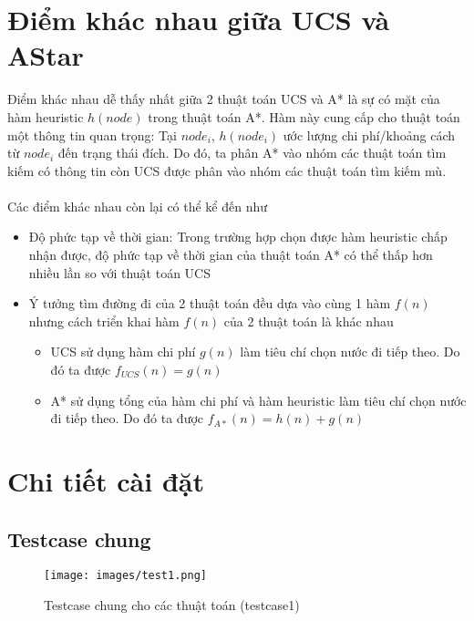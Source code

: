 \documentclass[a4paper, 12pt]{article}
\begin{document}
    \section{Điểm khác nhau giữa UCS và AStar} 
    Điểm khác nhau dễ thấy nhất giữa 2 thuật toán UCS và A* là sự có mặt của hàm heuristic $h(node)$ trong thuật toán A*. Hàm này cung cấp cho thuật toán một thông tin quan trọng: Tại $node_i$, $h(node_i)$ ước lượng chi phí/khoảng cách từ $node_i$ đến trạng thái đích. Do đó, ta phân A* vào nhóm các thuật toán tìm kiếm có thông tin còn UCS được phân vào nhóm các thuật toán tìm kiếm mù.\\\\
    Các điểm khác nhau còn lại có thể kể đến như
    \begin{itemize}
        \item Độ phức tạp về thời gian: Trong trường hợp chọn được hàm heuristic chấp nhận được, độ phức tạp về thời gian của thuật toán A* có thể thấp hơn nhiều lần so với thuật toán UCS
        \item Ý tưởng tìm đường đi của 2 thuật toán đều dựa vào cùng 1 hàm $f(n)$ nhưng cách triển khai hàm $f(n)$ của 2 thuật toán là khác nhau
        \begin{itemize}
            \item UCS sử dụng hàm chi phí $g(n)$ làm tiêu chí chọn nước đi tiếp theo. Do đó ta được $f_{UCS}(n) = g(n)$
            \item A* sử dụng tổng của hàm chi phí và hàm heuristic làm tiêu chí chọn nước đi tiếp theo. Do đó ta được $f_{A*}(n) = h(n) + g(n)$
        \end{itemize}
    \end{itemize}
    \clearpage

    \section{Chi tiết cài đặt}
    \subsection{Testcase chung}
    \begin{figure}[H]
        \begin{center}
            \texttt{[image: images/test1.png]}
            \caption{Testcase chung cho các thuật toán (testcase1)}
        \end{center}
    \end{figure}
\end{document}
